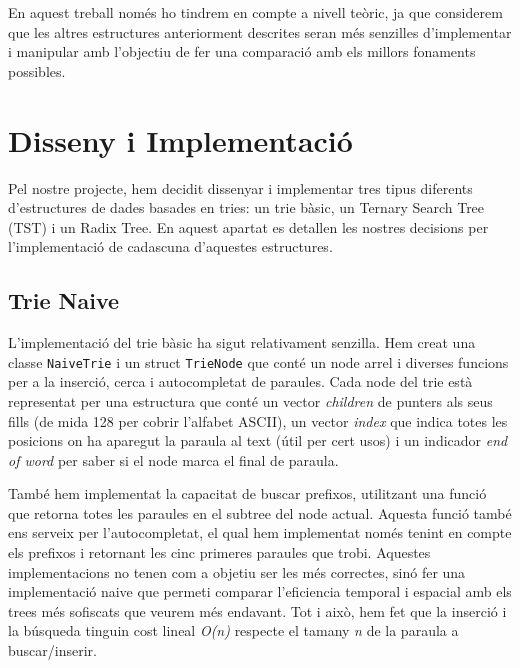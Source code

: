 En aquest treball només ho tindrem en compte a nivell teòric, ja que considerem que les altres estructures anteriorment descrites seran més senzilles d'implementar i manipular amb l'objectiu de fer una comparació amb els millors fonaments possibles. 

\section{Disseny i Implementació}
Pel nostre projecte, hem decidit dissenyar i implementar tres tipus diferents d'estructures de dades basades en tries: un trie bàsic, un Ternary Search Tree (TST) i un Radix Tree. En aquest apartat es detallen les nostres decisions per l'implementació de cadascuna d'aquestes estructures.

\subsection{Trie Naive}
L'implementació del trie bàsic ha sigut relativament senzilla. Hem creat una classe \texttt{NaiveTrie} i un struct \texttt{TrieNode} que conté un node arrel i diverses funcions per a la inserció, cerca i autocompletat de paraules. 
Cada node del trie està representat per una estructura que conté un vector \textit{children} de punters als seus fills (de mida 128 per cobrir l'alfabet ASCII), un vector \textit{index} que indica totes les posicions on ha aparegut la paraula al text (útil per cert usos) i un indicador \textit{end of word} per saber si el node marca el final de paraula.

També hem implementat la capacitat de buscar prefixos, utilitzant una funció que retorna totes les paraules en el subtree del node actual. Aquesta funció també ens serveix per l'autocompletat, el qual hem implementat només tenint en compte els prefixos i retornant les cinc primeres paraules que trobi.
Aquestes implementacions no tenen com a objetiu ser les més correctes, sinó fer una implementació naive que permeti comparar l'eficiencia temporal i espacial amb els trees més sofiscats que veurem més endavant. Tot i això, hem fet que la inserció i la búsqueda tinguin cost lineal \textit{O(n)} respecte el tamany \textit{n} de la paraula a buscar/inserir.

